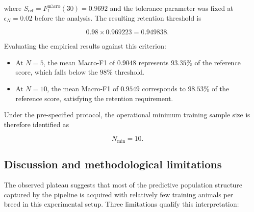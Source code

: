 where $S_{\mathrm{ref}} = \overline{F_1^{\mathrm{macro}}}(30) = 0.9692$
and the tolerance parameter was fixed at $\epsilon_N=0.02$ before the
analysis. The resulting retention threshold is

\begin{equation}
    0.98 \times 0.969223 = 0.949838.
\end{equation}

Evaluating the empirical results against this criterion:
\begin{itemize}
    \item At $N=5$, the mean Macro-F1 of $0.9048$ represents $93.35\%$ of
    the reference score, which falls below the $98\%$ threshold.
    \item At $N=10$, the mean Macro-F1 of $0.9549$ corresponds to $98.53\%$
    of the reference score, satisfying the retention requirement.
\end{itemize}

Under the pre-specified protocol, the operational minimum training sample
size is therefore identified as

\begin{equation}
    N_{\min} = 10.
\end{equation}

\subsection{Discussion and methodological limitations}

The observed plateau suggests that most of the predictive population
structure captured by the pipeline is acquired with relatively few
training animals per breed in this experimental setup. Three limitations
qualify this interpretation:

